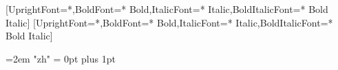 \usepackage{fontspec}
\usepackage{xeCJK}

\setmainfont{TeX Gyre Heros}[UprightFont=*,BoldFont=* Bold,ItalicFont=* Italic,BoldItalicFont=* Bold Italic]
\setsansfont{TeX Gyre Heros}[UprightFont=*,BoldFont=* Bold,ItalicFont=* Italic,BoldItalicFont=* Bold Italic]
\setmonofont{Latin Modern Mono}


\usepackage[
  ignoreheadfoot,
  top=1 cm, bottom=1 cm,
  left=1 cm, right=1.25 cm,
  footskip=1.25 cm
]{geometry}
\usepackage{titlesec}
\usepackage{hyperref}
\usepackage{bookmark}
\usepackage{enumitem}
\usepackage{changepage}
\usepackage{tabularx,array}
\usepackage{environ}
\usepackage{calc}
\usepackage[dvipsnames]{xcolor}
\usepackage{amsmath}
\usepackage{needspace}
\usepackage{paracol} %

\hypersetup{colorlinks=true, urlcolor=primaryColor}

\raggedright
\pagestyle{empty}
\setcounter{secnumdepth}{0}
\setlength{\parindent}{0pt}
\setlength{\topskip}{0pt}
\setlength{\columnsep}{0.15cm}

\emergencystretch=2em
\XeTeXlinebreaklocale "zh"
\XeTeXlinebreakskip = 0pt plus 1pt

[\vspace{1pt}\titlerule]
\titlespacing{\section}{-1pt}{0.2 cm}{0.2 cm}

\renewcommand\labelitemi{$\vcenter{\hbox{\small$\bullet$}}$}
\newenvironment{highlights}{
  \begin{itemize}[
    topsep=0.10 cm,
    parsep=0.10 cm,
    partopsep=0pt,
    itemsep=0pt,
    leftmargin=0.8cm,
    align=parleft
  ]
}{\end{itemize}}

\newenvironment{onecolentry}{%
  \par\noindent
  \begin{adjustwidth}{0pt}{0.20\linewidth}%
  \setlength{\parskip}{0.2em}%
}{%
  \end{adjustwidth}%
  \par
}

